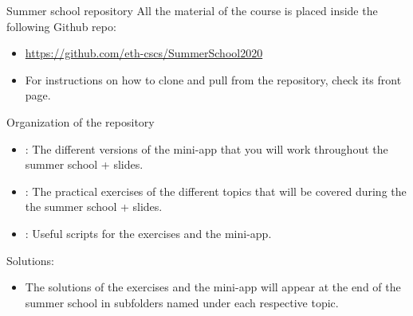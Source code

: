 \begin{frame}{Summer school repository}
  All the material of the course is placed inside the following Github repo:
  \begin{itemize}
  \item \url{https://github.com/eth-cscs/SummerSchool2020}
  \item For instructions on how to clone and pull from the repository, check
    its front page.
  \end{itemize}
  \vfill
  Organization of the repository
  \begin{itemize}
  \item {}: The different versions of the mini-app that you
    will work throughout the summer school + slides.
  \item {}: The practical exercises of the different topics
    that will be covered during the the summer school + slides.
  \item {}: Useful scripts for the exercises and the mini-app.
  \end{itemize}
  \vfill
  Solutions:
  \begin{itemize}
  \item The solutions of the exercises and the mini-app will appear at the end
    of the summer school in subfolders named  under each
    respective topic.
  \end{itemize}
\end{frame}
